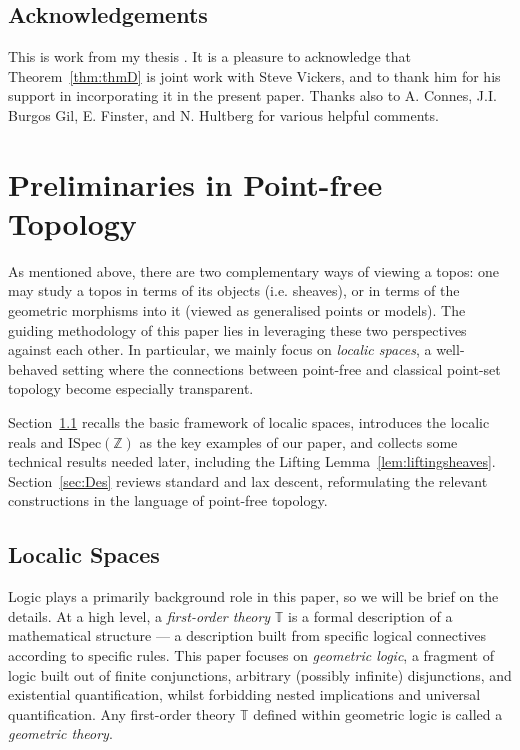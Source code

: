 \documentclass[a4paper, 11pt,reqno]{amsart}
\newcommand{\ISpec}{\mathrm{ISpec}}
\newcommand{\thT}{\mathbb{T}}
\newcommand{\Z}{\mathbb{Z}}
\begin{document}
\subsection*{Acknowledgements} This is work from my thesis \cite{NgThesis}. It is a pleasure to acknowledge that Theorem~\ref{thm:thmD} is joint work with Steve Vickers, and to thank him for his support in incorporating it in the present paper. Thanks also to A. Connes, J.I. Burgos Gil, E. Finster, and N. Hultberg for various helpful comments.
\tableofcontents




\section{Preliminaries in Point-free Topology}\label{sec:prelim} As mentioned above, there are two complementary ways of viewing a topos: one may study a topos in terms of its objects (i.e. sheaves), or in terms of the geometric morphisms into it (viewed as generalised points or models). The guiding methodology of this paper lies in leveraging these two perspectives against each other. In particular, we mainly focus on {\em localic spaces}, a well-behaved setting where the connections between point-free and classical point-set topology become especially transparent.

Section~\ref{sec:localic} recalls the basic framework of localic spaces, introduces the localic reals and $\ISpec(\Z)$ as the key examples of our paper, and collects some technical results needed later, including the Lifting Lemma~\ref{lem:liftingsheaves}. Section~\ref{sec:Des} reviews standard and lax descent, reformulating the relevant constructions in the language of point-free topology.

\subsection{Localic Spaces}\label{sec:localic} Logic plays a primarily background role in this paper, so we will be brief on the  details. At a high level, a {\em first-order theory} $\thT$ is a formal description of a mathematical structure --- a description built from specific logical connectives according to specific rules. This paper focuses on {\em geometric logic}, a fragment of logic built out of finite conjunctions, arbitrary (possibly infinite) disjunctions, and existential quantification, whilst forbidding nested implications and universal quantification. Any first-order theory $\thT$ defined within geometric logic is called a {\em geometric theory}.
\end{document}

